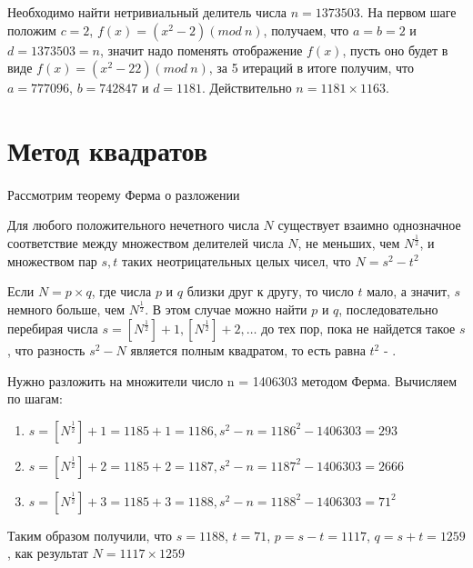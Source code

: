   \begin{example}
    Необходимо найти нетривиальный делитель числа $n = 1373503$. На первом шаге положим $c = 2$, $f(x) = (x^{2} - 2)(mod \: n)$, 
    получаем, что $a = b = 2$ и $d = 1373503 = n$, значит надо поменять отображение $f(x)$, пусть оно будет в виде 
    $f(x) = (x^{2} - 22)(mod \: n)$, за 5 итераций в итоге получим, что $a = 777096$, $b = 742847$ и $d = 1181$. 
    Действительно $n = 1181 \times 1163$.
  \end{example}  

\section{Метод квадратов}

\paragraph{} Рассмотрим теорему Ферма о разложении

  \begin{theorem}
    Для любого положительного нечетного числа $N$ существует взаимно однозначное соответствие между множеством делителей числа $N$, 
    не меньших, чем $N^{ \frac{1}{2}}$, и множеством пар ${s, t}$ таких неотрицательных целых чисел, что 
    $N = s^{ 2} - t^{ 2}$
  \end{theorem}

  Если $N = p \times q$, где числа $p$ и $q$ близки друг к другу, то число $t$ мало, а значит, $s$ немного больше,
  чем $N^{\frac{1}{2}}$. В этом случае можно найти $p$ и $q$, последовательно перебирая числа
  $s=[N^{ \frac{1}{2}}]+1, [N^{ \frac{1}{2}}]+2, \dots$ до тех пор, пока не найдется 
  такое $s$, что разность $s^{ 2} - N$ является полным квадратом, то есть равна $t^{ 2}$ - 
  \cite[Глава 6.4, страницы 216-225]{mah06}.
  
  \begin{example}
    Нужно разложить на множители число n = 1406303 методом Ферма. Вычисляем по шагам:
	\begin{enumerate}
	\item $s = [N^{ \frac{1}{2}}] + 1 = 1185 + 1 = 1186, s^{2} - n = 1186^{2} - 1406303 = 293$
	\item $s = [N^{ \frac{1}{2}}] + 2 = 1185 + 2 = 1187, s^{2} - n = 1187^{2} - 1406303 = 2666$
	\item $s = [N^{ \frac{1}{2}}] + 3 = 1185 + 3 = 1188, s^{2} - n = 1188^{2} - 1406303 = 71^{2}$
	\end{enumerate}

    Таким образом получили, что $s = 1188$, $t = 71$, $p = s - t = 1117$, $q = s + t = 1259$, как результат 
    $N = 1117 \times 1259$
  \end{example}


